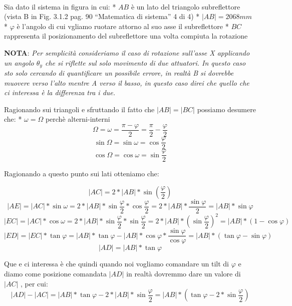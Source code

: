 \documentclass{article}
\begin{document}
    \begin{center}
    \end{center}
    { \hspace*{\fill} \\}
    

    Sia dato il sistema in figura in cui: * \(AB\) è un lato del triangolo
subreflettore (vista B in Fig. 3.1.2 pag. 90 ``Matematica di sistema'' 4
di 4) * \(|AB| = 2068mm\) * \(\varphi\) è l'angolo di cui vgliamo
ruotare attorno al suo asse il subreflettore * \(BC\) rappresenta il
posizionamento del subreflettore una volta compiuta la rotazione

    \textbf{NOTA}: \emph{Per semplicità consideriamo il caso di rotazione
sull'asse X applicando un angolo \(\theta_y\) che si riflette sul solo
movimento di due attuatori. In questo caso sto solo cercando di
quantificare un possibile errore, in realtà B si dovrebbe muovere verso
l'alto mentre A verso il basso, in questo caso direi che quello che ci
interessa è la differenza tra i due. }

    Ragionando sui triangoli e sfruttando il fatto che \(|AB| = |BC|\)
possiamo desumere che: * \(\omega = \Omega\) perchè alterni-interni
\[ \Omega = \omega = \frac{\pi - \varphi}{2} = \frac{\pi}{2} - \frac{\varphi}{2} \]
\[ \sin{\Omega} = \sin{\omega} = \cos{\frac{\varphi}{2}} \]
\[ \cos{\Omega} = \cos{\omega} = \sin{\frac{\varphi}{2}} \]

    Ragionando a questo punto sui lati otteniamo che:

    \[ |AC| = 2*|AB|*\sin(\frac{\varphi}{2}) \]
\[ |AE| = |AC| * \sin{\omega} = 2*|AB|*\sin{\frac{\varphi}{2}} * \cos{\frac{\varphi}{2}} = 2*|AB|*\frac{\sin{\varphi}}{2} = |AB|*\sin{\varphi}\]
\[ |EC| = |AC| * \cos{\omega} = 2*|AB|*\sin{\frac{\varphi}{2}} * \sin{\frac{\varphi}{2}}  = 2*|AB|*(\sin{\frac{\varphi}{2}})^2 = |AB|*(1 - \cos{\varphi}) \]
\[ |ED| = |EC| * \tan{\varphi} = |AB|* \tan{\varphi} - |AB|*\cos{\varphi}*\frac{\sin{\varphi}}{\cos{\varphi}} = |AB| * (\tan{\varphi} - \sin{\varphi})\]
\[ |AD| = |AB| * \tan{\varphi} \]

    Que e ci interessa è che quindi quando noi vogliamo comandare un tilt di
\(\varphi\) e diamo come posizione comandata \(|AD|\) in realtà dovremmo
dare un valore di \(|AC|\) , per cui:
\[ |AD| - |AC| = |AB| * \tan{\varphi} - 2*|AB|*\sin{\frac{\varphi}{2}} = |AB|*(\tan{\varphi} - 2*\sin{\frac{\varphi}{2}}) \]
\end{document}
